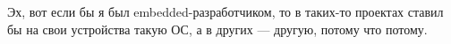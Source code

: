 \Conclusion %





Эх, вот если бы я был embedded-разработчиком, то в таких-то проектах ставил бы на свои устройства такую ОС, а в других --- другую, потому что потому.

